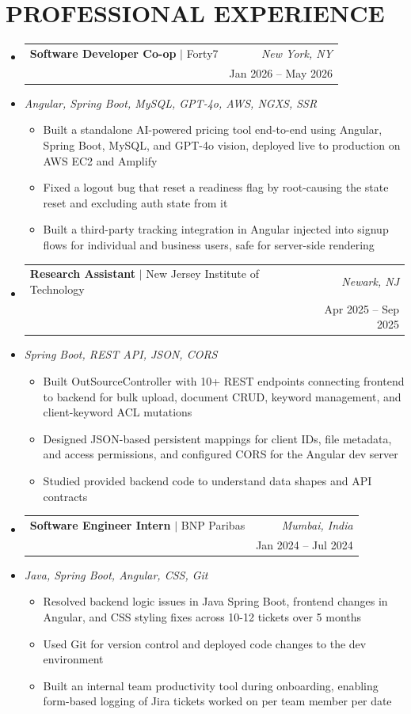 \documentclass[letterpaper,11pt]{article}
\makeatletter
\newcommand{\resumeItem}[1]{
  \item\small{#1\vspace{-3pt}}
}
\newcommand{\resumeStack}[1]{
  \vspace{1pt}\item\small{\textit{#1}}\vspace{-6pt}
}
\newcommand{\resumeExpHeading}[4]{
  \vspace{-3pt}\item
    \begin{tabular*}{1.0\textwidth}[t]{l@{\extracolsep{\fill}}r}
      \textbf{\large #1} $|$ #2 & \textit{\large #3} \\
       & {\small #4} \\
    \end{tabular*}\vspace{-9pt}
}
\newcommand{\resumeItemListStart}{\begin{itemize}[leftmargin=0.15in, label=$\bullet$]}
\newcommand{\resumeItemListEnd}{\end{itemize}\vspace{-7pt}}
\newcommand{\resumeSubHeadingListStart}{\begin{itemize}[leftmargin=0.0in, label={}]}
\newcommand{\resumeSubHeadingListEnd}{\end{itemize}}
\makeatother
\begin{document}
\section{PROFESSIONAL EXPERIENCE}
\resumeSubHeadingListStart
\vspace{10pt}
\resumeExpHeading
{Software Developer Co-op}{Forty7}{New York, NY}{Jan 2026 -- May 2026}
\vspace{-13pt}
\resumeStack{Angular, Spring Boot, MySQL, GPT-4o, AWS, NGXS, SSR}
\resumeItemListStart
  \resumeItem{Built a standalone AI-powered pricing tool end-to-end using Angular, Spring Boot, MySQL, and GPT-4o vision, deployed live to production on AWS EC2 and Amplify}
  \resumeItem{Fixed a logout bug that reset a readiness flag by root-causing the state reset and excluding auth state from it}
  \resumeItem{Built a third-party tracking integration in Angular injected into signup flows for individual and business users, safe for server-side rendering}
\resumeItemListEnd
\vspace{10pt}
\resumeExpHeading
{Research Assistant}{New Jersey Institute of Technology}{Newark, NJ}{Apr 2025 -- Sep 2025}
\vspace{-13pt}
\resumeStack{Spring Boot, REST API, JSON, CORS}
\resumeItemListStart
  \resumeItem{Built OutSourceController with 10+ REST endpoints connecting frontend to backend for bulk upload, document CRUD, keyword management, and client-keyword ACL mutations}
  \resumeItem{Designed JSON-based persistent mappings for client IDs, file metadata, and access permissions, and configured CORS for the Angular dev server}
  \resumeItem{Studied provided backend code to understand data shapes and API contracts}
\resumeItemListEnd
\vspace{10pt}
\resumeExpHeading
{Software Engineer Intern}{BNP Paribas}{Mumbai, India}{Jan 2024 -- Jul 2024}
\vspace{-13pt}
\resumeStack{Java, Spring Boot, Angular, CSS, Git}
\resumeItemListStart
  \resumeItem{Resolved backend logic issues in Java Spring Boot, frontend changes in Angular, and CSS styling fixes across 10-12 tickets over 5 months}
  \resumeItem{Used Git for version control and deployed code changes to the dev environment}
  \resumeItem{Built an internal team productivity tool during onboarding, enabling form-based logging of Jira tickets worked on per team member per date}
\resumeItemListEnd

\resumeSubHeadingListEnd

\vspace{-3pt}
\end{document}
